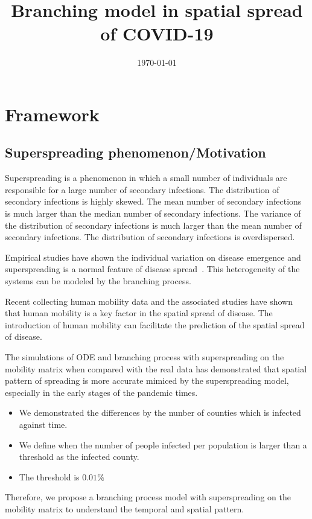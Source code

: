 \documentclass{article}
\title{Branching model in spatial spread of COVID-19}
\date{\today}
\begin{document}
\setlength{\parindent}{0cm}

\maketitle


\section{Framework}
\subsection{Superspreading phenomenon/Motivation}
Superspreading is a phenomenon in which a small number of individuals are responsible for a large number of secondary infections. The distribution of secondary infections is highly skewed. The mean number of secondary infections is much larger than the median number of secondary infections. The variance of the distribution of secondary infections is much larger than the mean number of secondary infections. The distribution of secondary infections is overdispersed.

Empirical studies have shown the individual variation on disease emergence and superspreading is a normal feature of disease spread~\cite{lloyd2005superspreading}. This heterogeneity of the systems can be modeled by the branching process.

Recent collecting human mobility data and the associated studies have shown that human mobility is a key factor in the spatial spread of disease. The introduction of human mobility can facilitate the prediction of the spatial spread of disease.

The simulations of ODE and branching process with superspreading  on the mobility matrix when compared with the real data has demonstrated that spatial pattern of spreading is more accurate mimiced by the superspreading model, especially in the early stages of the pandemic times. 

\begin{itemize}
    \item We demonstrated the differences by the nunber of counties which is infected against time.
    \item We define when the number of people infected per population is larger than a threshold as the infected county.
    \item The threshold is $0.01\%$
\end{itemize}

Therefore, we propose a branching process model with superspreading on the mobility matrix to understand the temporal and spatial pattern.
\end{document}
